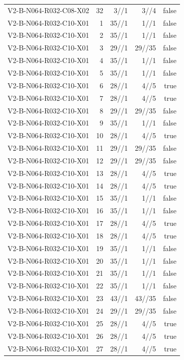 {\begin{longtable}{lrrrr}
V2-B-N064-R032-C08-X02 & 32 & 3//1 & 3//4 & false \\
V2-B-N064-R032-C10-X01 & 1 & 35//1 & 1//1 & false \\
V2-B-N064-R032-C10-X01 & 2 & 35//1 & 1//1 & false \\
V2-B-N064-R032-C10-X01 & 3 & 29//1 & 29//35 & false \\
V2-B-N064-R032-C10-X01 & 4 & 35//1 & 1//1 & false \\
V2-B-N064-R032-C10-X01 & 5 & 35//1 & 1//1 & false \\
V2-B-N064-R032-C10-X01 & 6 & 28//1 & 4//5 & true \\
V2-B-N064-R032-C10-X01 & 7 & 28//1 & 4//5 & true \\
V2-B-N064-R032-C10-X01 & 8 & 29//1 & 29//35 & false \\
V2-B-N064-R032-C10-X01 & 9 & 35//1 & 1//1 & false \\
V2-B-N064-R032-C10-X01 & 10 & 28//1 & 4//5 & true \\
V2-B-N064-R032-C10-X01 & 11 & 29//1 & 29//35 & false \\
V2-B-N064-R032-C10-X01 & 12 & 29//1 & 29//35 & false \\
V2-B-N064-R032-C10-X01 & 13 & 28//1 & 4//5 & true \\
V2-B-N064-R032-C10-X01 & 14 & 28//1 & 4//5 & true \\
V2-B-N064-R032-C10-X01 & 15 & 35//1 & 1//1 & false \\
V2-B-N064-R032-C10-X01 & 16 & 35//1 & 1//1 & false \\
V2-B-N064-R032-C10-X01 & 17 & 28//1 & 4//5 & true \\
V2-B-N064-R032-C10-X01 & 18 & 28//1 & 4//5 & true \\
V2-B-N064-R032-C10-X01 & 19 & 35//1 & 1//1 & false \\
V2-B-N064-R032-C10-X01 & 20 & 35//1 & 1//1 & false \\
V2-B-N064-R032-C10-X01 & 21 & 35//1 & 1//1 & false \\
V2-B-N064-R032-C10-X01 & 22 & 35//1 & 1//1 & false \\
V2-B-N064-R032-C10-X01 & 23 & 43//1 & 43//35 & false \\
V2-B-N064-R032-C10-X01 & 24 & 29//1 & 29//35 & false \\
V2-B-N064-R032-C10-X01 & 25 & 28//1 & 4//5 & true \\
V2-B-N064-R032-C10-X01 & 26 & 28//1 & 4//5 & true \\
V2-B-N064-R032-C10-X01 & 27 & 28//1 & 4//5 & true \\

\end{longtable}}
